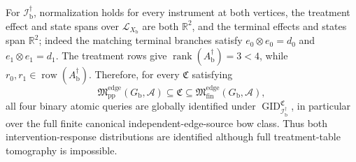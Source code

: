 For \(\mathcal I_{\mathrm b}^{\dagger}\), normalization holds for every instrument at both vertices, the treatment effect and state spans over \(\mathcal L_{X_{\mathrm b}}\) are both \(\mathbb R^2\), and the terminal effects and states span \(\mathbb R^2\); indeed the matching terminal branches satisfy \(e_0\otimes e_0=d_0\) and \(e_1\otimes e_1=d_1\).  The treatment rows give \(\operatorname{rank}(A_{\mathrm b}^{\dagger})=3<4\), while \(r_0,r_1\in\operatorname{row}(A_{\mathrm b}^{\dagger})\).  Therefore, for every \(\mathfrak C\) satisfying
\[
\mathfrak M_{\mathrm{pp}}^{\mathrm{edge}}(G_{\mathrm b},\mathcal A)
\subseteq\mathfrak C
\subseteq\mathfrak M_{\mathrm{fin}}^{\mathrm{edge}}(G_{\mathrm b},\mathcal A),
\]
all four binary atomic queries are globally identified under \(\operatorname{GID}_{\mathcal I_{\mathrm b}^{\dagger}}^{\mathfrak C}\), in particular over the full finite canonical independent-edge-source bow class.  Thus both intervention-response distributions are identified although full treatment-table tomography is impossible.